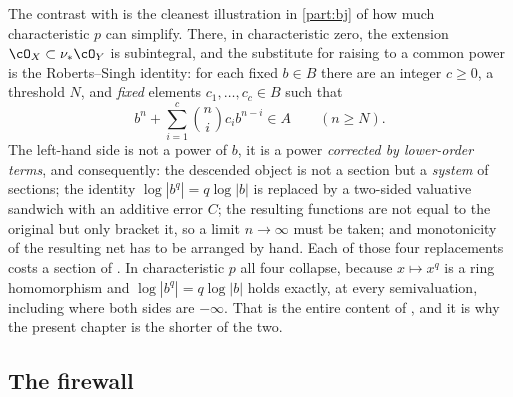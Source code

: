 The contrast with  is the cleanest
illustration in \cref{part:bj} of how much characteristic $p$ can
simplify.  There, in characteristic zero, the extension
$\cO_X\subset\nu_*\cO_Y$ is subintegral, and the substitute for raising to a common power is the Roberts--Singh
identity: for each fixed $b\in B$ there are an integer
$c\ge0$, a threshold $N$, and \emph{fixed} elements
$c_1,\ldots,c_c\in B$ such that
\[
 b^n+\sum_{i=1}^{c}\binom nic_ib^{n-i}\in A
 \qquad(n\ge N).
\]
The left-hand side is not a power of $b$, it is a power \emph{corrected by
lower-order terms}, and consequently:
the descended object is not a section but a \emph{system} of sections;
the identity $\log|b^q|=q\log|b|$ is replaced by a two-sided valuative
sandwich with an additive error $C$; the resulting functions are not equal
to the original but only bracket it, so a limit $n\to\infty$ must be
taken; and monotonicity of the resulting net has to be arranged by hand.
Each of those four replacements costs a section of
.  In characteristic $p$ all four
collapse, because $x\mapsto x^q$ is a ring homomorphism and
$\log|b^q|=q\log|b|$ holds exactly, at every semivaluation, including where
both sides are $-\infty$.  That is the entire content of
, and it is why the present chapter is
the shorter of the two.

\subsection{The firewall}
\label{sec:ch43-firewall}

